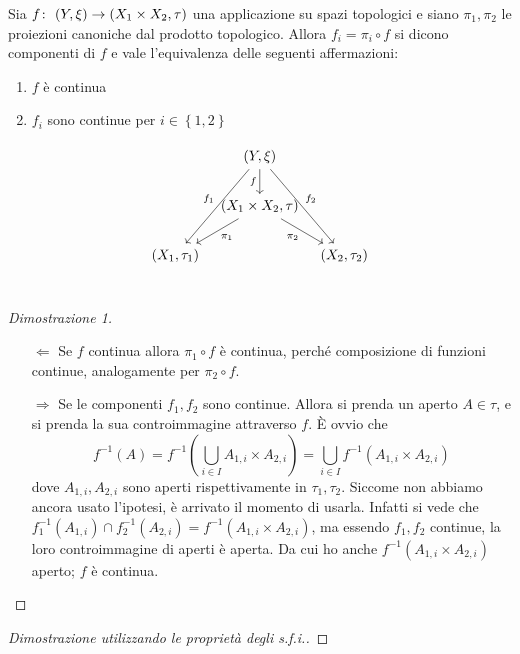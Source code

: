 \begin{theorem}
	Sia $f \colon\ (Y, \xi) \rightarrow (X_1 \times X_2, \tau)$ una applicazione su spazi topologici e siano $\pi_1,\pi_2$ le proiezioni canoniche dal prodotto topologico. Allora $f_i = \pi_i \circ f$ si dicono componenti di $f$ e vale l'equivalenza delle seguenti affermazioni:
	\begin{enumerate}
		\item $f$ è continua
		\item $f_i$ sono continue per $i \in \left\{1,2\right\}$
	\end{enumerate}
	\begin{equation*}
	\begin{tikzcd}[column sep=0.7em]
	& (Y, \xi) \arrow[swap]{d}{f} \arrow[swap]{ddl}{f_1} \arrow{ddr}{f_2} & \\
	& (X_1 \times X_2, \tau) \arrow[swap]{dr}{\pi_2} \arrow{dl}{\pi_1} & \\
	(X_1, \tau_1) &  & (X_2, \tau_2)\\
	\end{tikzcd}
	\end{equation*}

\end{theorem}
\begin{proof}[Dimostrazione 1] \
	\begin{enumerate}
		\item[$\Leftarrow$] Se $f$ continua allora $\pi_1 \circ f$ è continua, perché composizione di funzioni continue, analogamente per $\pi_2 \circ f$.
		\item[$\Rightarrow$] Se le componenti $f_1, f_2$ sono continue. Allora si prenda un aperto $A \in \tau$, e si prenda la sua controimmagine attraverso $f$. È ovvio che 
		\begin{equation*}
			f^{-1}(A) = f^{-1}(\bigcup_{i \in I} A_{1,i} \times A_{2,i}) = \bigcup_{i \in I} f^{-1}(A_{1,i} \times A_{2,i})
		\end{equation*}
		dove $A_{1,i}, A_{2,i}$ sono aperti rispettivamente in $\tau_1, \tau_2$. Siccome non abbiamo ancora usato l'ipotesi, è arrivato il momento di usarla. Infatti si vede che $f^{-1}_1(A_{1,i}) \cap f^{-1}_2(A_{2,i}) = f^{-1}(A_{1,i} \times A_{2,i})$, ma essendo $f_1, f_2$ continue, la loro controimmagine di aperti è aperta. Da cui ho anche $f^{-1}(A_{1,i} \times A_{2,i})$ aperto; $f$ è continua. 
	\end{enumerate}
\end{proof}
\begin{proof}[Dimostrazione utilizzando le proprietà degli s.f.i.]
\end{proof}


